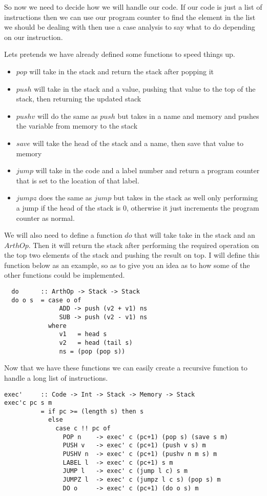 So now we need to decide how we will handle our code. If our code is just a list of instructions then we can use our program counter to find the element in the list we should be dealing with then use a case analysis to say what to do depending on our instruction.

Lets pretends we have already defined some functions to speed things up. 
\begin{itemize}
\item $pop$ will take in the stack and return the stack after popping it
\item $push$ will take in the stack and a value, pushing that value to the top of the stack, then returning the updated stack
\item $pushv$ will do the same as $push$ but takes in a name and memory and pushes the variable from memory to the stack
\item $save$ will take the head of the stack and a name, then save that value to memory
\item $jump$ will take in the code and a label number and return a program counter that is set to the location of that label.
\item $jumpz$ does the same as $jump$ but takes in the stack as well only performing a jump if the head of the stack is 0, otherwise it just increments the program counter as normal.
\end{itemize}

 
We will also need to define a function $do$ that will take take in the stack and an $ArthOp$. Then it will return the stack after performing the required operation on the top two elements of the stack and pushing the result on top. I will define this function below as an example, so as to give you an idea as to how some of the other functions could be implemented.

\begin{lstlisting}
  do      :: ArthOp -> Stack -> Stack
  do o s  = case o of
               ADD -> push (v2 + v1) ns 
               SUB -> push (v2 - v1) ns
            where 
               v1   = head s
               v2   = head (tail s)
               ns = (pop (pop s)) 
\end{lstlisting}

\newpage

Now that we have these functions we can easily create a recursive function to handle a long list of instructions. 

\begin{lstlisting}[basicstyle=\ttfamily\small]
exec'     :: Code -> Int -> Stack -> Memory -> Stack
exec'c pc s m 
          = if pc >= (length s) then s 
            else 
              case c !! pc of
                POP n    -> exec' c (pc+1) (pop s) (save s m)
                PUSH v   -> exec' c (pc+1) (push v s) m
                PUSHV n  -> exec' c (pc+1) (pushv n m s) m
                LABEL l  -> exec' c (pc+1) s m
                JUMP l   -> exec' c (jump l c) s m
                JUMPZ l  -> exec' c (jumpz l c s) (pop s) m
                DO o     -> exec' c (pc+1) (do o s) m               
\end{lstlisting}

